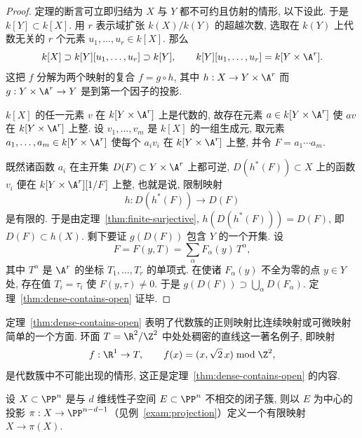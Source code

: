 \begin{proof}
	定理的断言可立即归结为 $X$ 与 $Y$ 都不可约且仿射的情形, 以下设此. 于是 $k[Y] \subset k[X]$. 用 $r$ 表示域扩张 $k(X)/k(Y)$ 的超越次数, 选取在 $k(Y)$ 上代数无关的 $r$ 个元素 $u_1, \ldots, u_r \in k[X]$. 那么
	\[
		k[X] \supset k[Y][u_1, \ldots, u_r] \supset k[Y], \qquad k[Y][u_1, \ldots, u_r] = k[Y \times \A^r].
	\]
	这把 $f$ 分解为两个映射的复合 $f = g \circ h$, 其中 $h: X \to Y \times \A^r$ 而 $g: Y \times \A^r \to Y$ 是到第一个因子的投影.

	$k[X]$ 的任一元素 $v$ 在 $k[Y \times \A^r]$ 上是代数的, 故存在元素 $a \in k[Y \times \A^r]$ 使 $av$ 在 $k[Y \times \A^r]$ 上整. 设 $v_1, \ldots, v_m$ 是 $k[X]$ 的一组生成元, 取元素 $a_1, \ldots, a_m \in k[Y \times \A^r]$ 使每个 $a_i v_i$ 在 $k[Y \times \A^r]$ 上整, 并令 $F = a_1 \cdots a_m$.

	既然诸函数 $a_i$ 在主开集 $D(F) \subset Y \times \A^r$ 上都可逆, $D(h^*(F)) \subset X$ 上的函数 $v_i$ 便在 $k[Y \times \A^r][1/F]$ 上整, 也就是说, 限制映射
	\[
		h: D(h^*(F)) \to D(F)
	\]
	是有限的. 于是由定理~\ref{thm:finite-surjective}, $h(D(h^*(F))) = D(F)$, 即 $D(F) \subset h(X)$. 剩下要证 $g(D(F))$ 包含 $Y$ 的一个开集. 设
	\[
		F = F(y, T) = \sum_\alpha F_\alpha(y)\, T^\alpha,
	\]
	其中 $T^\alpha$ 是 $\A^r$ 的坐标 $T_1, \ldots, T_r$ 的单项式. 在使诸 $F_\alpha(y)$ 不全为零的点 $y \in Y$ 处, 存在值 $T_i = \tau_i$ 使 $F(y, \tau) \ne 0$. 于是 $g(D(F)) \supset \bigcup_\alpha D(F_\alpha)$. 定理~\ref{thm:dense-contains-open} 证毕.
\end{proof}

定理~\ref{thm:dense-contains-open} 表明了代数簇的正则映射比连续映射或可微映射简单的一个方面. 环面 $T = \R^2/\Z^2$ 中处处稠密的直线这一著名例子, 即映射
\[
	f: \R^1 \to T, \qquad f(x) = (x, \sqrt{2}\, x) \bmod \Z^2,
\]
是代数簇中不可能出现的情形, 这正是定理~\ref{thm:dense-contains-open} 的内容.

\begin{theorem}\label{thm:projection-finite}
	设 $X \subset \PP^n$ 是与 $d$ 维线性子空间 $E \subset \PP^n$ 不相交的闭子簇, 则以 $E$ 为中心的投影 $\pi: X \to \PP^{n-d-1}$（见例~\ref{exam:projection}）定义一个有限映射 $X \to \pi(X)$.
\end{theorem}

